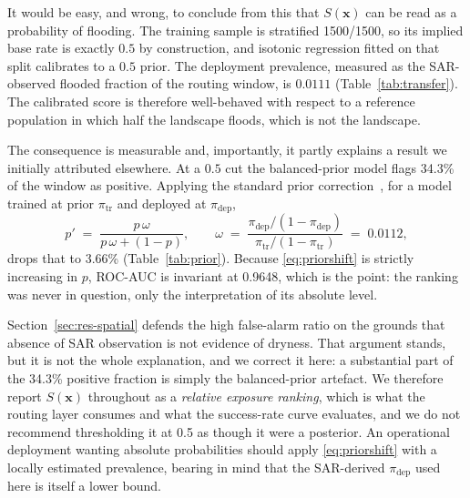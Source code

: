 \documentclass[11pt,a4paper]{article}
\newcommand{\Sx}{S(\mathbf{x})}
\begin{document}
It would be easy, and wrong, to conclude from this that $\Sx$ can be read as a
probability of flooding. The training sample is stratified \num{1500}/\num{1500},
so its implied base rate is exactly $0.5$ by construction, and isotonic
regression fitted on that split calibrates to a $0.5$ prior. The deployment
prevalence, measured as the SAR-observed flooded fraction of the routing window,
is $0.0111$ (Table~\ref{tab:transfer}). The calibrated score is therefore
well-behaved with respect to a reference population in which half the landscape
floods, which is not the landscape.

The consequence is measurable and, importantly, it partly explains a result we
initially attributed elsewhere. At a $0.5$ cut the balanced-prior model flags
34.3\% of the window as positive. Applying the standard prior
correction~\citep{elkan2001,saerens2002}, for a model trained at prior
$\pi_{\mathrm{tr}}$ and deployed at $\pi_{\mathrm{dep}}$,
\begin{equation}
p' \;=\; \frac{p\,\omega}{p\,\omega + (1-p)},
\qquad
\omega \;=\; \frac{\pi_{\mathrm{dep}}/(1-\pi_{\mathrm{dep}})}
                  {\pi_{\mathrm{tr}}/(1-\pi_{\mathrm{tr}})} \;=\; 0.0112,
\label{eq:priorshift}
\end{equation}
drops that to 3.66\% (Table~\ref{tab:prior}). Because \eqref{eq:priorshift} is
strictly increasing in $p$, ROC-AUC is invariant at 0.9648, which is the point:
the ranking was never in question, only the interpretation of its absolute level.

Section~\ref{sec:res-spatial} defends the high false-alarm ratio on the grounds
that absence of SAR observation is not evidence of dryness. That argument stands,
but it is not the whole explanation, and we correct it here: a substantial part
of the 34.3\% positive fraction is simply the balanced-prior artefact. We
therefore report $\Sx$ throughout as a \emph{relative exposure ranking}, which is
what the routing layer consumes and what the success-rate curve evaluates, and we
do not recommend thresholding it at 0.5 as though it were a posterior. An
operational deployment wanting absolute probabilities should apply
\eqref{eq:priorshift} with a locally estimated prevalence, bearing in mind that
the SAR-derived $\pi_{\mathrm{dep}}$ used here is itself a lower bound.
\end{document}
